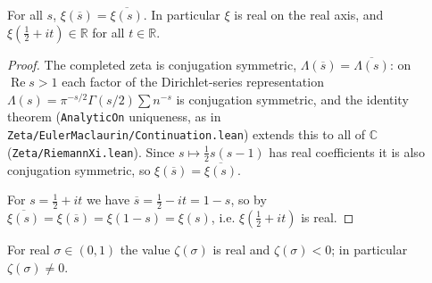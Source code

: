 \begin{lemma}
\label{lem:nf_xi_conj}
\leanok
{}
For all $s$, $\xi(\overline{s}) = \overline{\xi(s)}$. In particular $\xi$ is
real on the real axis, and $\xi(\tfrac12+it)\in\mathbb{R}$ for all $t\in\mathbb{R}$.
\end{lemma}

\begin{proof}
\leanok
{}
The completed zeta is conjugation symmetric, $\Lambda(\overline{s})=\overline{\Lambda(s)}$:
on $\operatorname{Re} s>1$ each factor of the Dirichlet-series representation
$\Lambda(s)=\pi^{-s/2}\Gamma(s/2)\sum n^{-s}$ is conjugation symmetric, and the identity
theorem (\texttt{AnalyticOn} uniqueness, as in
\texttt{Zeta/EulerMaclaurin/Continuation.lean}) extends this to all of $\mathbb{C}$
(\texttt{Zeta/RiemannXi.lean}).
Since $s\mapsto \tfrac12 s(s-1)$ has real coefficients it is also conjugation
symmetric, so $\xi(\overline{s})=\overline{\xi(s)}$.

For $s=\tfrac12+it$ we have $\overline{s}=\tfrac12-it = 1-s$, so by
$\overline{\xi(s)} = \xi(\overline{s}) = \xi(1-s) = \xi(s)$, i.e. $\xi(\tfrac12+it)$
is real.
\end{proof}

\begin{lemma}
\label{lem:nf_zeta_real_neg}
\leanok
{}
For real $\sigma\in(0,1)$ the value $\zeta(\sigma)$ is real and $\zeta(\sigma)<0$; in
particular $\zeta(\sigma)\neq0$.
\end{lemma}

